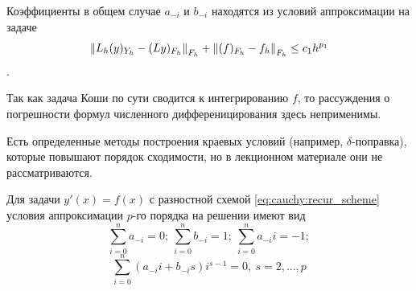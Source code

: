 Коэффициенты в общем случае $a_{-i}$ и $b_{-i}$ находятся из условий
аппроксимации на задаче
\[\left\lVert L_h(y)_{Y_h} - (Ly)_{F_h}\right\rVert_{F_h}+\left\lVert(f)_{F_h}-f_h\right\rVert_{F_h}\leq c_1h^{p_1}\].

\begin{remark}
  Так как задача Коши по сути сводится к интегрированию $f$, то
  рассуждения о погрешности формул численного дифференицирования здесь неприменимы.
\end{remark}

\begin{remark}
  Есть определенные методы построения краевых условий (например, $\delta$-поправка),
  которые повышают порядок сходимости, но в лекционном материале они не рассматриваются.
\end{remark}

\begin{theorem}
  Для задачи $y'(x)=f(x)$ с разностной схемой \eqref{eq:cauchy:recur_scheme}
  условия аппроксимации $p$-го порядка на решении имеют вид
  \[\sum_{i=0}^na_{-i}=0;\ \sum_{i=0}^nb_{-i}=1;\ \sum_{i=0}^na_{-i}i=-1;\]
  \[\sum_{i=0}^n(a_{-i}i+b_{-i}s)i^{s-1}=0,\ s=2,\ldots,p\]
\end{theorem}
